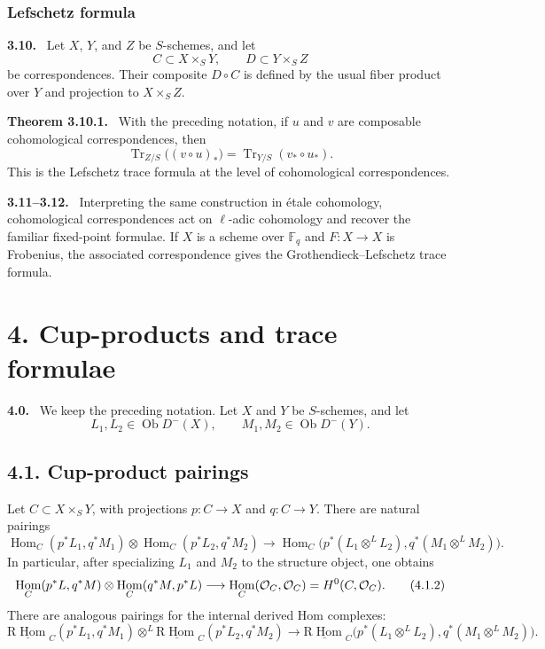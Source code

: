 \documentclass[11pt]{article}
\theoremstyle{plain}
\theoremstyle{definition}
\theoremstyle{remark}
\newenvironment{statement}[1]{\par\medskip\noindent\textbf{#1.}\ }{\par\medskip}
\newcommand{\FF}{\mathbb F}
\DeclareMathOperator{\Hom}{Hom}
\DeclareMathOperator{\ob}{Ob}
\DeclareMathOperator{\Tr}{Tr}
\newcommand{\R}{\mathrm R}
\begin{document}
\subsubsection*{Lefschetz formula}

\begin{statement}{3.10}
Let $X$, $Y$, and $Z$ be $S$-schemes, and let
\[
   C\subset X\times_S Y,
   \qquad
   D\subset Y\times_S Z
\]
be correspondences. Their composite $D\circ C$ is defined by the usual fiber product over $Y$ and projection to $X\times_S Z$.
\end{statement}

\begin{statement}{Theorem 3.10.1}
With the preceding notation, if $u$ and $v$ are composable cohomological correspondences, then
\[
   \Tr_{Z/S}\bigl((v\circ u)_*\bigr)=\Tr_{Y/S}(v_*\circ u_*).
\]
This is the Lefschetz trace formula at the level of cohomological correspondences.
\end{statement}

\begin{statement}{3.11--3.12}
Interpreting the same construction in étale cohomology, cohomological correspondences act on $\ell$-adic cohomology and recover the familiar fixed-point formulae. If $X$ is a scheme over $\FF_q$ and $F:X\to X$ is Frobenius, the associated correspondence gives the Grothendieck--Lefschetz trace formula.
\end{statement}

\section*{4. Cup-products and trace formulae}

\begin{statement}{4.0}
We keep the preceding notation. Let $X$ and $Y$ be $S$-schemes, and let
\[
   L_1,L_2\in\ob D^-(X),\qquad M_1,M_2\in\ob D^-(Y).
\]
\end{statement}

\subsection*{4.1. Cup-product pairings}
Let $C\subset X\times_S Y$, with projections $p:C\to X$ and $q:C\to Y$. There are natural pairings
\begin{equation}
\Hom_C(p^*L_1,q^*M_1)\otimes \Hom_C(p^*L_2,q^*M_2)
\longrightarrow
\Hom_C\bigl(p^*(L_1\otimes^L L_2),q^*(M_1\otimes^L M_2)\bigr).
\tag{4.1.1}
\end{equation}
In particular, after specializing $L_1$ and $M_2$ to the structure object, one obtains
\begin{equation}
\Hom_C(p^*L,q^*M)\otimes \Hom_C(q^*M,p^*L)
\longrightarrow \Hom_C(\cO_C,\cO_C)=H^0(C,\cO_C).
\tag{4.1.2}
\end{equation}
There are analogous pairings for the internal derived Hom complexes:
\begin{equation}
\underline{\R\Hom}_C(p^*L_1,q^*M_1)\otimes^L
\underline{\R\Hom}_C(p^*L_2,q^*M_2)
\longrightarrow
\underline{\R\Hom}_C\bigl(p^*(L_1\otimes^L L_2),q^*(M_1\otimes^L M_2)\bigr).
\tag{4.1.4}
\end{equation}
\end{document}
